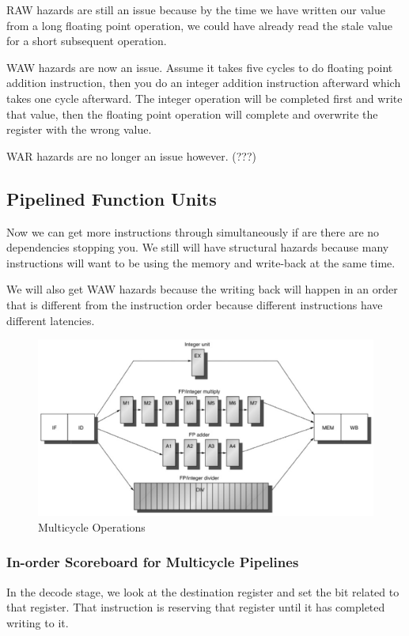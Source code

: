 \documentclass{article}
\begin{document}
RAW hazards are still an issue because by the time we have written our value from a long floating point operation, we could have already read the stale value for a short subsequent operation.

WAW hazards are now an issue. Assume it takes five cycles to do floating point addition instruction, then you do an integer addition instruction afterward which takes one cycle afterward. The integer operation will be completed first and write that value, then the floating point operation will complete and overwrite the register with the wrong value.

WAR hazards are no longer an issue however. (???)

 \subsection{Pipelined Function Units}

Now we can get more instructions through simultaneously if are there are no dependencies stopping you. We still will have structural hazards because many instructions will want to be using the memory and write-back at the same time.

We will also get WAW hazards because the writing back will happen in an order that is different from the instruction order because different instructions have different latencies.

\begin{figure}[ht!]
\centering
\includegraphics[width=120mm]{img/PipelinedFU.png}
\caption{Multicycle Operations}
\end{figure}

\subsubsection{In-order Scoreboard for Multicycle Pipelines}

In the decode stage, we look at the destination register and set the bit related to that register. That instruction is reserving that register until it has completed writing to it.
\end{document}
